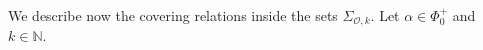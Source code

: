 \documentclass{amsart}
\theoremstyle{definition}
\newcommand{\mo}{\mathcal{O}}
\begin{document}

 We describe now the covering relations inside the sets $\Sigma_{\mo,k}$. Let $\alpha \in \Phi_0^+$ and $k \in \mathbb{N}$.
\end{document}
